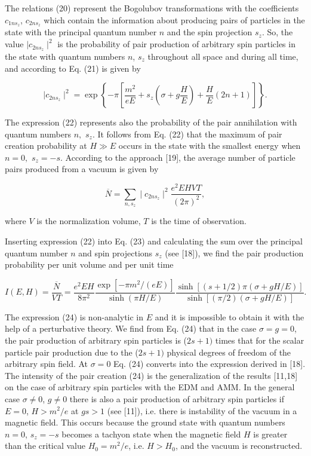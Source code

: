 \documentclass[a4paper,12pt]{article}
\begin{document}
The relations (20) represent the Bogolubov transformations with
the coefficients $c_{1ns_z}$, $c_{2ns_z}$ which contain the
information about producing pairs of particles in the state with
the principal quantum number $ n$ and the spin projection $s_z$.
So, the value $\mid c_{2ns_z}\mid ^2$ is the probability of pair
production of arbitrary spin particles in the state with quantum
numbers $n$, $s_z$ throughout all space and during all time, and
according to Eq. (21) is given by

\begin{equation}
\mid c_{2ns_z}\mid ^2=\exp \left\{ -\pi \left[ \frac{m^2}{eE}+s_z\left(
\sigma +g\frac HE\right) +\frac HE(2n+1)\right] \right\}.  \label{22}
\end{equation}

The expression (22) represents also the probability of the pair annihilation
with quantum numbers $n,$ $s_z$. It follows from Eq. (22) that the maximum
of pair creation probability at $H\gg E$ occurs in the state with the
smallest energy when $n=0,$ $s_z=-s$. According to the approach [19], the
average number of particle pairs produced from a vacuum is given by

\begin{equation}
\overline{N}=\sum_{n,s_z}\mid c_{2ns_z}\mid ^2\frac{e^2EHVT}{(2\pi )^2},
\label{23}
\end{equation}

where $V$ is the normalization volume, $T$ is the time of observation.

Inserting expression (22) into Eq. (23) and calculating the sum over the
principal quantum number $n$ and spin projections $s_z$ (see [18]), we find
the pair production probability per unit volume and per unit time

\begin{equation}
I(E,H)=\frac{\overline{N}}{VT}=\frac{e^2EH}{8\pi ^2}\frac{\exp \left[ -\pi
m^2/(eE)\right] }{\sinh \left( \pi H/E\right) }\frac{\sinh \left[ (s+1/2)\pi
\left( \sigma +gH/E\right) \right] }{\sinh \left[ \left( \pi /2\right)
\left( \sigma +gH/E\right) \right] }.  \label{24}
\end{equation}

The expression (24) is non-analytic in $E$ and it is impossible to
obtain it with the help of a perturbative theory. We find from Eq.
(24) that in the case $\sigma =g=0$, the pair production of
arbitrary spin particles is ($ 2s+1)$ times that for the scalar
particle pair production due to the ($2s+1)$ physical degrees of
freedom of the arbitrary spin field. At $\sigma =0$ Eq. (24)
converts into the expression derived in [18]. The intensity of the
pair creation (24) is the generalization of the results [11,18] on
the case of arbitrary spin particles with the EDM and AMM. In the
general case $\sigma \neq 0$, $g\neq 0$ there is also a pair
production of arbitrary spin particles if $E=0$, $H>m^2/e$ at
$gs>1$ (see [11]), i.e. there is instability of the vacuum in a
magnetic field. This occurs because the ground state with quantum
numbers $n=0$, $s_z=-s$ becomes a tachyon state when the magnetic
field $H$ is greater than the critical value $H_0=m^2/e$, i.e.
$H>H_0$, and the vacuum is reconstructed.
\end{document}

